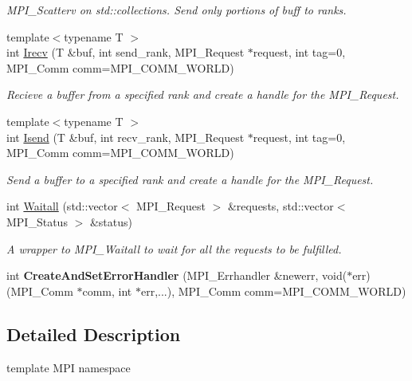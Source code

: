 \begin{DoxyCompactItemize}
\begin{DoxyCompactList}\small\item\em M\-P\-I\-\_\-\-Scatterv on std\-::collections. Send only portions of buff to ranks. \end{DoxyCompactList}\item 
{\footnotesize template$<$typename T $>$ }\\int \hyperlink{namespaceop_1_1mpi_a317712a568fa23673022ad79dc2dc8e7}{Irecv} (T \&buf, int send\-\_\-rank, M\-P\-I\-\_\-\-Request $\ast$request, int tag=0, M\-P\-I\-\_\-\-Comm comm=M\-P\-I\-\_\-\-C\-O\-M\-M\-\_\-\-W\-O\-R\-L\-D)
\begin{DoxyCompactList}\small\item\em Recieve a buffer from a specified rank and create a handle for the M\-P\-I\-\_\-\-Request. \end{DoxyCompactList}\item 
{\footnotesize template$<$typename T $>$ }\\int \hyperlink{namespaceop_1_1mpi_a1e5258511e16ca8cd393101936b540c8}{Isend} (T \&buf, int recv\-\_\-rank, M\-P\-I\-\_\-\-Request $\ast$request, int tag=0, M\-P\-I\-\_\-\-Comm comm=M\-P\-I\-\_\-\-C\-O\-M\-M\-\_\-\-W\-O\-R\-L\-D)
\begin{DoxyCompactList}\small\item\em Send a buffer to a specified rank and create a handle for the M\-P\-I\-\_\-\-Request. \end{DoxyCompactList}\item 
int \hyperlink{namespaceop_1_1mpi_a879a6c4063062fe7544fd7da82c46f4f}{Waitall} (std\-::vector$<$ M\-P\-I\-\_\-\-Request $>$ \&requests, std\-::vector$<$ M\-P\-I\-\_\-\-Status $>$ \&status)
\begin{DoxyCompactList}\small\item\em A wrapper to M\-P\-I\-\_\-\-Waitall to wait for all the requests to be fulfilled. \end{DoxyCompactList}\item 
\hypertarget{namespaceop_1_1mpi_adc71d35ec9a7f9cc9a2414bb9d4a2c1a}{int {\bfseries Create\-And\-Set\-Error\-Handler} (M\-P\-I\-\_\-\-Errhandler \&newerr, void($\ast$err)(M\-P\-I\-\_\-\-Comm $\ast$comm, int $\ast$err,...), M\-P\-I\-\_\-\-Comm comm=M\-P\-I\-\_\-\-C\-O\-M\-M\-\_\-\-W\-O\-R\-L\-D)}\label{namespaceop_1_1mpi_adc71d35ec9a7f9cc9a2414bb9d4a2c1a}

\end{DoxyCompactItemize}


\subsection{Detailed Description}
template M\-P\-I namespace 

